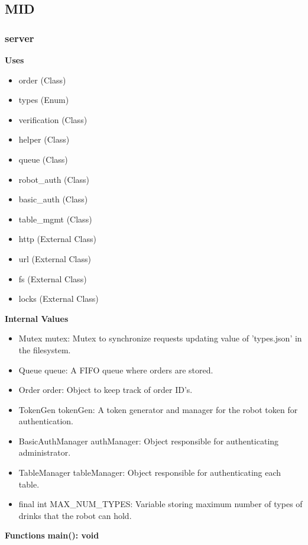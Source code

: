 \documentclass [10pt]{article}
\begin{document}
\subsection{MID}


\subsubsection{server}
\textbf{Uses}
\begin{itemize}
	\item order (Class)
	\item types (Enum)
	\item verification (Class)
	\item helper (Class)
	\item queue (Class)
	\item robot\_auth (Class)
	\item basic\_auth (Class)
	\item table\_mgmt (Class)
	\item http (External Class)
	\item url (External Class)
	\item fs (External Class)
	\item locks (External Class)
\end{itemize}

\textbf{Internal Values}
\begin{itemize}
	\item Mutex mutex: Mutex to synchronize requests updating value of 'types.json' in the filesystem.
	\item Queue queue: A FIFO queue where orders are stored.
	\item Order order: Object to keep track of order ID's.
	\item TokenGen tokenGen: A token generator and manager for the robot token for authentication.
	\item BasicAuthManager authManager: Object responsible for authenticating administrator.
	\item TableManager tableManager: Object responsible for authenticating each table.
	\item final int MAX\_NUM\_TYPES: Variable storing maximum number of types of drinks that the robot can hold.
\end{itemize}

\textbf{Functions}
\textbf{main(): void}
\end{document}
